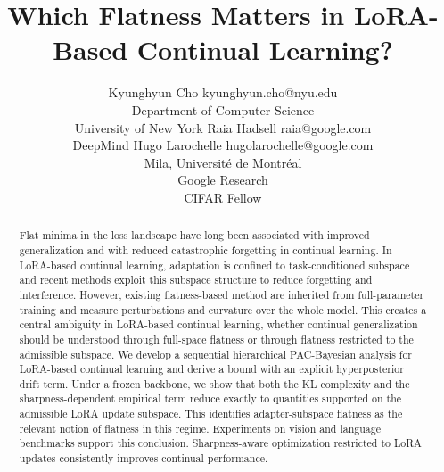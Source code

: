 \documentclass[10pt]{article} %
\title{Which Flatness Matters in LoRA-Based Continual Learning?}
\author{\name Kyunghyun Cho \email kyunghyun.cho@nyu.edu \\
      \addr Department of Computer Science\\
      University of New York
      \AND
      \name Raia Hadsell \email raia@google.com \\
      \addr DeepMind
      \AND
      \name Hugo Larochelle \email hugolarochelle@google.com\\
      \addr Mila, Universit\'e de Montr\'eal \\
      Google Research\\
      CIFAR Fellow}
\begin{document}
\maketitle

\begin{abstract}




Flat minima in the loss landscape have long been associated with improved generalization and with reduced catastrophic forgetting in continual learning. In LoRA-based continual learning, adaptation is confined to task-conditioned subspace and recent methods exploit this subspace structure to reduce forgetting and interference. However, existing flatness-based method are inherited from full-parameter training and measure perturbations and curvature over the whole model. This creates a central ambiguity in LoRA-based continual learning, whether continual generalization should be understood through full-space flatness or through flatness restricted to the admissible subspace. We develop a sequential hierarchical PAC-Bayesian analysis for LoRA-based continual learning and derive a bound with an explicit hyperposterior drift term. Under a frozen backbone, we show that both the KL complexity and the sharpness-dependent empirical term reduce exactly to quantities supported on the admissible LoRA update subspace. This identifies adapter-subspace flatness as the relevant notion of flatness in this regime.
Experiments on vision and language benchmarks support this conclusion. Sharpness-aware optimization restricted to LoRA updates consistently improves continual performance.


\end{abstract}
\end{document}
